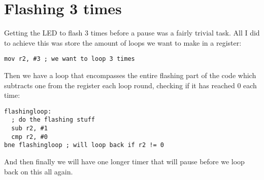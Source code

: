 \documentclass[11pt]{scrartcl}
\begin{document}
\section*{Flashing 3 times}
Getting the LED to flash 3 times before a pause was a fairly trivial task. All I did to
achieve this was store the amount of loops we want to make in a register:
\begin{verbatim}
mov r2, #3 ; we want to loop 3 times
\end{verbatim}
Then we have a loop that encompasses the entire flashing part of the code which subtracts
one from the register each loop round, checking if it has reached 0 each time:
\begin{verbatim}
flashingloop:
  ; do the flashing stuff
  sub r2, #1
  cmp r2, #0
bne flashingloop ; will loop back if r2 != 0
\end{verbatim}
And then finally we will have one longer timer that will pause before we loop back on
this all again.
\end{document}
